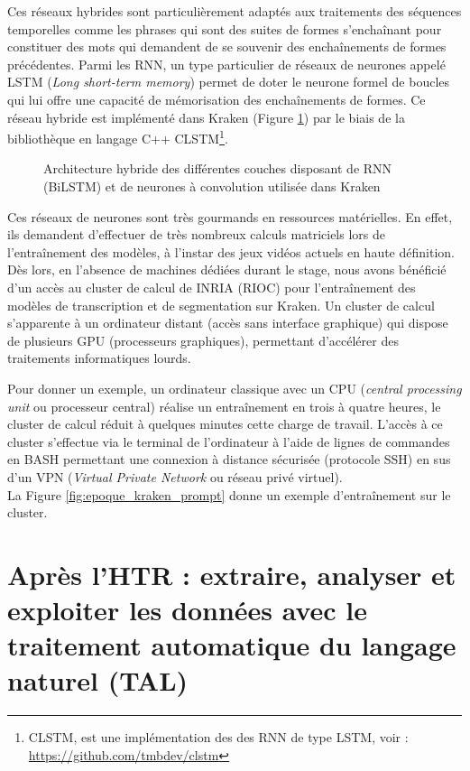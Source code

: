 Ces réseaux hybrides sont particulièrement adaptés aux traitements des séquences temporelles comme les phrases qui sont des suites de formes s'enchaînant pour constituer des mots qui demandent de se souvenir des enchaînements de formes précédentes. Parmi les RNN, un type particulier de réseaux de neurones appelé LSTM (\textit{Long short-term memory}) permet de doter le neurone formel de boucles qui lui offre une capacité de mémorisation des enchaînements de formes. Ce réseau hybride est implémenté dans Kraken (Figure \ref{fig:graph_neurones_artificiels}) par le biais de la bibliothèque en langage C++ CLSTM\footnote{CLSTM, est une implémentation des des RNN de type LSTM, voir : \url{https://github.com/tmbdev/clstm}}. 
\begin{figure}[h!]
    \centering
    \centerline{}
    \caption{Architecture hybride des différentes couches disposant de RNN (BiLSTM) et de neurones à convolution utilisée dans Kraken \textcopyright \cite{kiessling_kraken_2019}}
    \label{fig:graph_neurones_artificiels}
\end{figure}
\newpage
Ces réseaux de neurones sont très gourmands en ressources matérielles. En effet, ils demandent d'effectuer de très nombreux calculs matriciels lors de l'entraînement des modèles, à l'instar des jeux vidéos actuels en haute définition. Dès lors, en l'absence de machines dédiées durant le stage, nous avons bénéficié d'un accès au cluster de calcul de INRIA (RIOC) pour l'entraînement des modèles de transcription et de segmentation sur Kraken. Un cluster de calcul s'apparente à un ordinateur distant (accès sans interface graphique) qui dispose de plusieurs GPU (processeurs graphiques), permettant d'accélérer des traitements informatiques lourds. 

Pour donner un exemple, un ordinateur classique avec un CPU (\textit{central processing unit} ou processeur central) réalise un entraînement en trois à quatre heures, le cluster de calcul réduit à quelques minutes cette charge de travail. L'accès à ce cluster s'effectue via le terminal de l'ordinateur à l'aide de lignes de commandes en BASH permettant une connexion à distance sécurisée (protocole SSH) en sus d'un VPN (\textit{Virtual Private Network} ou réseau privé virtuel).\\ La Figure \ref{fig:epoque_kraken_prompt} donne un exemple d'entraînement sur le cluster.
\newpage
\section{Après l'HTR : extraire, analyser et exploiter les données avec le traitement automatique du langage naturel (TAL)}\label{TAL_repertoire}

